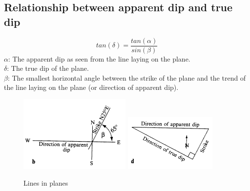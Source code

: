 \documentclass[12pt,a4paper]{report}
\begin{document}
\subsection*{Relationship between apparent dip and true dip}
$$ tan(\delta) = \frac{tan(\alpha)}{sin(\beta)} $$
\textbf{$\alpha$}: The apparent dip as seen from the line laying on the plane.\\
\textbf{$\delta$}: The true dip of the plane.\\
\textbf{$\beta$}: The smallest horizontal angle between the strike of the plane and the trend of the line laying on the plane (or direction of apparent dip).\\
\begin{figure}[h]
  \includegraphics[scale=0.80]{relation-between-true-and-apparent-dip-1.png}
  \includegraphics[scale=0.80]{relation-between-true-and-apparent-dip-2.png}
  \centering
  \caption{Lines in planes}
\end{figure}

\end{document}
